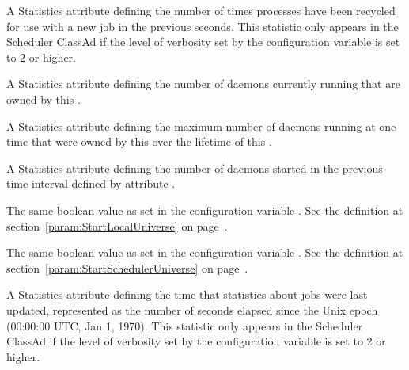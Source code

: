 \begin{description}
\item[\AdAttr{ShadowsRecycled}:] A Statistics attribute defining
  the number of times  processes have been 
  recycled for use with a new job
  in the previous  seconds.
  This statistic only appears in the Scheduler ClassAd if the level of
  verbosity set by the configuration variable 
  is set to 2 or higher.

\item[\AdAttr{ShadowsRunning}:] A Statistics attribute defining
  the number of  daemons currently running 
  that are owned by this .

\item[\AdAttr{ShadowsRunningPeak}:] A Statistics attribute defining
  the maximum number of  daemons running at one time
  that were owned by this  over the lifetime of 
  this .

\item[\AdAttr{ShadowsStarted}:] A Statistics attribute defining
  the number of  daemons started
  in the previous time interval defined by attribute .

\item[\AdAttr{StartLocalUniverse}:] The same boolean value as set in the
  configuration variable .
  See the definition at section~\ref{param:StartLocalUniverse} on
  page~\pageref{param:StartLocalUniverse}.

\item[\AdAttr{StartSchedulerUniverse}:] The same boolean value as set in the
  configuration variable .
  See the definition at section~\ref{param:StartSchedulerUniverse} on
  page~\pageref{param:StartSchedulerUniverse}.

\item[\AdAttr{StatsLastUpdateTime}:] A Statistics attribute defining
  the time that statistics about jobs were last updated,
  represented as the number of seconds elapsed since
  the Unix epoch (00:00:00 UTC, Jan 1, 1970).
  This statistic only appears in the Scheduler ClassAd if the level of
  verbosity set by the configuration variable 
  is set to 2 or higher.


\end{description}
